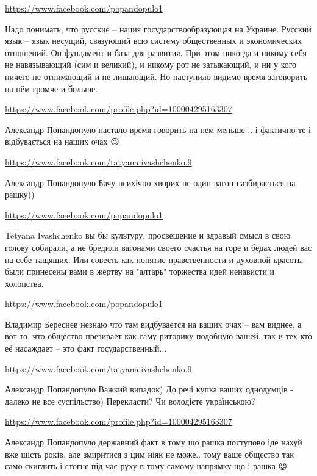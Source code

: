 \documentclass[a4paper,11pt]{extreport}
\begin{document}
\begin{itemize}
\begin{itemize}
\end{itemize}
\url{https://www.facebook.com/popandopulo1}

Надо понимать, что русские – нация государствообразующая на Украине. Русский язык – язык несущий, связующий всю систему общественных и экономических отношений. Он фундамент и база для развития. При этом никогда и никому себя не навязывающий (сим и великий), и никому рот не затыкающий, и ни у кого ничего не отнимающий и не лишающий. Но наступило видимо время заговорить на нём громче и больше.

\begin{itemize}
\url{https://www.facebook.com/profile.php?id=100004295163307}

Александр Попандопуло настало время говорить на нем меньше .. і фактично те і відбувається на наших очах 😉

\url{https://www.facebook.com/tatyana.ivashchenko.9}

Александр Попандопуло Бачу психічно хворих не один вагон назбирається на рашку))

\url{https://www.facebook.com/popandopulo1}

Tetyana Ivashchenko вы бы культуру, просвещение и здравый смысл в свою голову собирали, а не бредили вагонами своего счастья на горе и бедах людей вас на себе тащящих. Или совесть как понятие нравственности и духовной красоты были принесены вами в жертву на "алтарь" торжества идей ненависти и холопства.

\url{https://www.facebook.com/popandopulo1}

Владимир Береснев незнаю что там видбувается на ваших очах – вам виднее, а вот то, что общество презирает как саму риторику подобную вашей, так и тех кто её насаждает – это факт государственный...

\url{https://www.facebook.com/tatyana.ivashchenko.9}

Александр Попандопуло Важкий випадок)
До речі купка ваших однодумців - далеко не все суспільство) Перекласти? Чи володієте українською?

\url{https://www.facebook.com/profile.php?id=100004295163307}

Александр Попандопуло державний факт в тому що рашка поступово іде нахуй вже шість років, але змиритися з цим ніяк не може.. тому ваше общєство так само скиглить і стогне під час руху в тому самому напрямку що і рашка 😉


\end{itemize}
\end{itemize}
\end{document}
